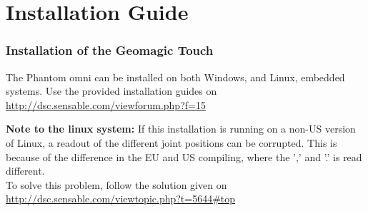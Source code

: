 \chapter{Installation Guide}

\subsection{Installation of the Geomagic Touch}
The Phantom omni can be installed on both Windows, and Linux, embedded systems. 
Use the provided installation guides on\\
\url{http://dsc.sensable.com/viewforum.php?f=15}

\textbf{Note to the linux system:} If this installation is running on a non-US version of Linux, a readout of the different joint positions can be corrupted. This is because of the difference in the EU and US compiling, where the ',' and '.' is read different.\\
To solve this problem, follow the solution given on\\
\url{http://dsc.sensable.com/viewtopic.php?t=5644#top}